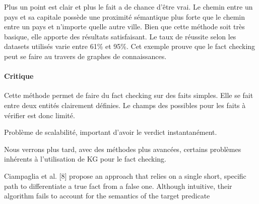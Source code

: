 
Plus un point est clair et plus le fait a de chance d'être vrai. Le chemin entre un pays et sa capitale possède une proximité sémantique plus forte que le chemin entre un pays et n'importe quelle autre ville. Bien que cette méthode soit très basique, elle apporte des résultats satisfaisant. Le taux de réussite selon les datasets utilisés varie entre 61\% et 95\%. Cet exemple prouve que le fact checking peut se faire au travers de graphes de connaissances. 

\paragraph{Critique} Cette méthode permet de faire du fact checking sur des faits simples. Elle se fait entre deux entités clairement définies. Le champs des possibles pour les faits à vérifier est donc limité.

Problème de scalabilité, important d'avoir le verdict instantanément.

Nous verrons plus tard, avec des méthodes plus avancées, certains problèmes inhérents à l'utilisation de KG pour le fact checking.

Ciampaglia et al. [8] propose
an approach that relies on a single short, specific path to
differentiate a true fact from a false one. Although intuitive,
their algorithm fails to account for the semantics of the target
predicate


